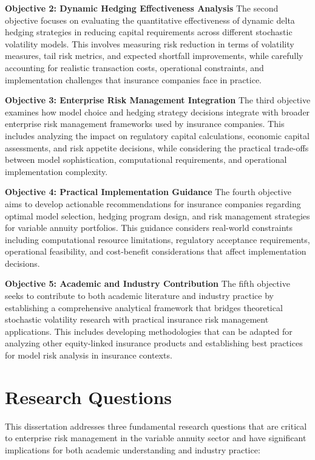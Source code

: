 \documentclass[12pt,a4paper]{report}
\begin{document}
\textbf{Objective 2: Dynamic Hedging Effectiveness Analysis}
The second objective focuses on evaluating the quantitative effectiveness of dynamic delta hedging strategies in reducing capital requirements across different stochastic volatility models. This involves measuring risk reduction in terms of volatility measures, tail risk metrics, and expected shortfall improvements, while carefully accounting for realistic transaction costs, operational constraints, and implementation challenges that insurance companies face in practice.

\textbf{Objective 3: Enterprise Risk Management Integration}
The third objective examines how model choice and hedging strategy decisions integrate with broader enterprise risk management frameworks used by insurance companies. This includes analyzing the impact on regulatory capital calculations, economic capital assessments, and risk appetite decisions, while considering the practical trade-offs between model sophistication, computational requirements, and operational implementation complexity.

\textbf{Objective 4: Practical Implementation Guidance}
The fourth objective aims to develop actionable recommendations for insurance companies regarding optimal model selection, hedging program design, and risk management strategies for variable annuity portfolios. This guidance considers real-world constraints including computational resource limitations, regulatory acceptance requirements, operational feasibility, and cost-benefit considerations that affect implementation decisions.

\textbf{Objective 5: Academic and Industry Contribution}
The fifth objective seeks to contribute to both academic literature and industry practice by establishing a comprehensive analytical framework that bridges theoretical stochastic volatility research with practical insurance risk management applications. This includes developing methodologies that can be adapted for analyzing other equity-linked insurance products and establishing best practices for model risk analysis in insurance contexts.

\section{Research Questions}

This dissertation addresses three fundamental research questions that are critical to enterprise risk management in the variable annuity sector and have significant implications for both academic understanding and industry practice:
\end{document}
